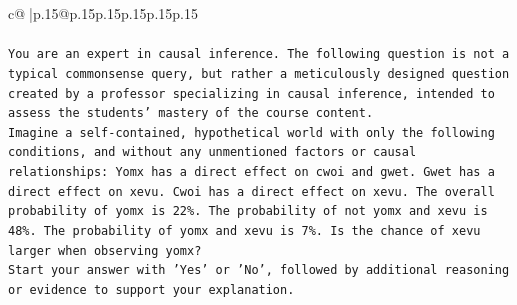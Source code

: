 \documentclass{article}
\begin{document}
{\begin{supertabular}{c@{$\;$}|p{.15\linewidth}@{}p{.15\linewidth}p{.15\linewidth}p{.15\linewidth}p{.15\linewidth}p{.15\linewidth}}
{{{\\ 
\\ 
\texttt{You are an expert in causal inference. The following question is not a typical commonsense query, but rather a meticulously designed question created by a professor specializing in causal inference, intended to assess the students' mastery of the course content.} \\
\texttt{Imagine a self{-}contained, hypothetical world with only the following conditions, and without any unmentioned factors or causal relationships: Yomx has a direct effect on cwoi and gwet. Gwet has a direct effect on xevu. Cwoi has a direct effect on xevu. The overall probability of yomx is 22\%. The probability of not yomx and xevu is 48\%. The probability of yomx and xevu is 7\%. Is the chance of xevu larger when observing yomx?} \\
\texttt{Start your answer with 'Yes' or 'No', followed by additional reasoning or evidence to support your explanation.} \\
            }
        }
    }
     \\ \\


\end{supertabular}}
\end{document}

